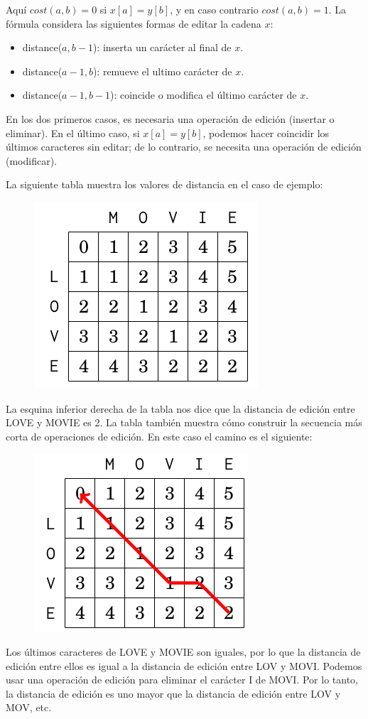 Aquí $cost( a, b ) = 0$ si $x[a]=y[b]$, y en caso contrario $cost(a,b)=1$. La fórmula considera las siguientes formas de editar la cadena $x$:

\begin{itemize}
	\item distance($a, b-1$): inserta un carácter al final de $x$.
    \item distance($a-1, b$): remueve el ultimo carácter de $x$.
    \item distance($a-1, b-1$): coincide o modifica el último carácter de $x$.
\end{itemize}

En los dos primeros casos, es necesaria una operación de edición (insertar o eliminar). En el último caso, si $x[a] = y[b]$, podemos hacer coincidir los últimos caracteres sin editar; de lo contrario, se necesita una operación de edición (modificar).

La siguiente tabla muestra los valores de distancia en el caso de ejemplo:

\begin{figure}[h!]
	\centering
	\includegraphics[width=0.3\linewidth]{img/edit_distance}
	\label{fig:editdistance}
\end{figure}


La esquina inferior derecha de la tabla nos dice que la distancia de edición entre LOVE y MOVIE es 2. La tabla también muestra cómo construir la secuencia más corta de operaciones de edición. En este caso el camino es el siguiente:

\begin{figure}[h!]
	\centering
	\includegraphics[width=0.3\linewidth]{img/edit_distance_2}
	\label{fig:editdistance2}
\end{figure}

Los últimos caracteres de LOVE y MOVIE son iguales, por lo que la distancia de edición entre ellos es igual a la distancia de edición entre LOV y MOVI. Podemos usar una operación de edición para eliminar el carácter I de MOVI. Por lo tanto, la distancia de edición es uno mayor que la distancia de edición entre LOV y MOV, etc.